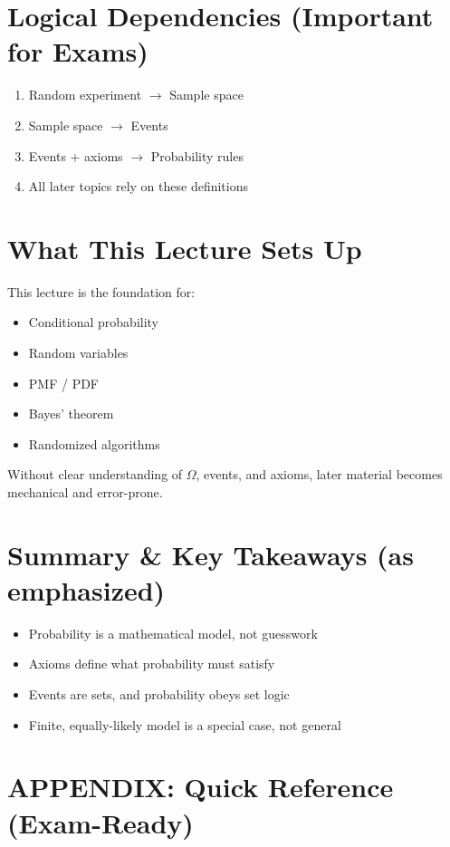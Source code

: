 \documentclass[11pt]{article}
\begin{document}
\section{Logical Dependencies (Important for Exams)}
\begin{enumerate}
    \item Random experiment $\to$ Sample space
    \item Sample space $\to$ Events
    \item Events + axioms $\to$ Probability rules
    \item All later topics rely on these definitions
\end{enumerate}

\section{What This Lecture Sets Up}
This lecture is the foundation for:
\begin{itemize}
    \item Conditional probability
    \item Random variables
    \item PMF / PDF
    \item Bayes' theorem
    \item Randomized algorithms
\end{itemize}
Without clear understanding of $\Omega$, events, and axioms, later material becomes mechanical and error-prone.

\section{Summary \& Key Takeaways (as emphasized)}
\begin{itemize}
    \item Probability is a mathematical model, not guesswork
    \item Axioms define what probability must satisfy
    \item Events are sets, and probability obeys set logic
    \item Finite, equally-likely model is a special case, not general
\end{itemize}

\newpage
\section*{APPENDIX: Quick Reference (Exam-Ready)}
\end{document}
